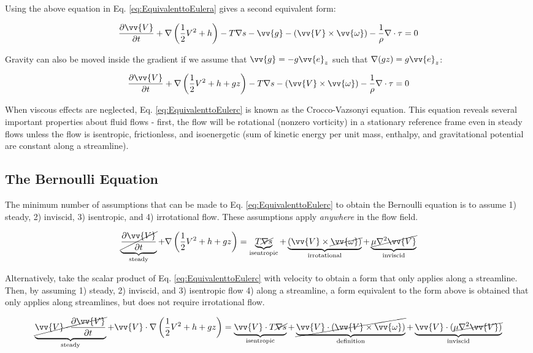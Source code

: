 \documentclass[10pt]{article}
\newcommand{\beq}{\begin{equation}}
\newcommand{\eeq}{\end{equation}}
\begin{document}
\begin{flushleft}
Using the above equation in Eq. \eqref{eq:EquivalenttoEulera} gives a second equivalent form:

\beq
\label{eq:EquivalenttoEulerb}
\frac{\partial \vv{V}}{\partial t}+\nabla\left(\frac{1}{2}V^2+h\right)-T\nabla s-\vv{g}-(\vv{V}\times\vv{\omega})-\frac{1}{\rho}\nabla\cdot\tau=0
\eeq

Gravity can also be moved inside the gradient if we assume that \(\vv{g}=-g\vv{e}_z\) such that \(\nabla(gz)=g\vv{e}_z\):

\beq
\label{eq:EquivalenttoEulerc}
\frac{\partial \vv{V}}{\partial t}+\nabla\left(\frac{1}{2}V^2+h+gz\right)-T\nabla s-(\vv{V}\times\vv{\omega})-\frac{1}{\rho}\nabla\cdot\tau=0
\eeq

When viscous effects are neglected, Eq. \eqref{eq:EquivalenttoEulerc} is known as the Crocco-Vazsonyi equation. This equation reveals several important properties about fluid flows - first, the flow will be rotational (nonzero vorticity) in a stationary reference frame even in steady flows unless the flow is isentropic, frictionless, and isoenergetic (sum of kinetic energy per unit mass, enthalpy, and gravitational potential are constant along a streamline).

\subsection{The Bernoulli Equation}
The minimum number of assumptions that can be made to Eq. \ref{eq:EquivalenttoEulerc} to obtain the Bernoulli equation is to assume 1) steady, 2) inviscid, 3) isentropic, and 4) irrotational flow. These assumptions apply {\it anywhere} in the flow field.

\beq
\label{eq:Bernoulli1}
\underbrace{\cancel{\frac{\partial \vv{V}}{\partial t}}}_{\textrm{steady}}+\nabla\left(\frac{1}{2}V^2+h+gz\right)=\underbrace{T\cancel{\nabla s}}_{\text{isentropic}}+\underbrace{(\vv{V}\times\cancel{\vv{\omega})}}_{\text{irrotational}}+\underbrace{\cancel{\mu\nabla^2\vv{V}}}_{\text{inviscid}}
\eeq

Alternatively, take the scalar product of Eq. \ref{eq:EquivalenttoEulerc} with velocity to obtain a form that only applies along a streamline. Then, by assuming 1) steady, 2) inviscid, and 3) isentropic flow 4) along a streamline, a form equivalent to the form above is obtained that only applies along streamlines, but does not require irrotational flow.

\beq
\label{eq:Bernoulli2}
\underbrace{\cancel{\vv{V}\cdot\frac{\partial \vv{V}}{\partial t}}}_{\text{steady}}+\vv{V}\cdot\nabla\left(\frac{1}{2}V^2+h+gz\right)=\underbrace{\vv{V}\cdot T\cancel{\nabla s}}_{\text{isentropic}}+\underbrace{\cancel{\vv{V}\cdot(\vv{V}\times\vv{\omega})}}_{\text{definition}}+\underbrace{\vv{V}\cdot(\cancel{\mu\nabla^2\vv{V})}}_{\text{inviscid}}
\eeq


\end{flushleft}
\end{document}
